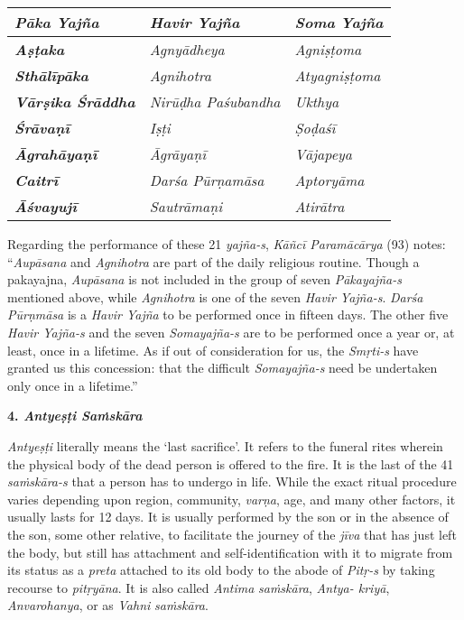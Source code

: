 \begin{longtable}{|l|l|l|}
\hline
\emph{Pāka} \emph{Yajña} & \emph{Havir} \emph{Yajña} & \emph{Soma} \emph{Yajña}\tabularnewline
\hline
\emph{\textbf{Aṣṭaka}} & \emph{Agnyādheya} & \emph{Agniṣṭoma}\tabularnewline
\hline
\emph{\textbf{Sthālīpāka}} & \emph{Agnihotra} & \emph{Atyagniṣṭoma}\tabularnewline
\hline
\emph{\textbf{Vārṣika Śrāddha}} & \emph{Nirūḍha Paśubandha} & \emph{Ukthya}\tabularnewline
\hline
\emph{\textbf{Śrāvaṇī}} & \emph{Iṣṭi} & \emph{Ṣoḍaśī}\tabularnewline
\hline
\emph{\textbf{Āgrahāyaṇī}} & \emph{Āgrāyaṇī} & \emph{Vājapeya}\tabularnewline
\hline
\emph{\textbf{Caitrī}} & \emph{Darśa Pūrṇamāsa} & \emph{Aptoryāma}\tabularnewline
\hline
\emph{\textbf{Āśvayujī}} & \emph{Sautrāmaṇi} & \emph{Atirātra}\tabularnewline
\hline
\end{longtable}

Regarding the performance of these 21 \emph{yajña-s}, \emph{Kāñcī Paramācārya} (93) notes: ``\emph{Aupāsana} and \emph{Agnihotra} are part of the daily religious routine. Though a pakayajna, \emph{Aupāsana} is not included in the group of seven \emph{Pākayajña-s} mentioned above, while \emph{Agnihotra} is one of the seven \emph{Havir Yajña-s}. \emph{Darśa Pūrṇmāsa} is a \emph{Havir Yajña} to be performed once in fifteen days. The other five \emph{Havir Yajña-s} and the seven \emph{Somayajña-s} are to be performed once a year or, at least, once in a lifetime. As if out of consideration for us, the \emph{Smṛti-s} have granted us this concession: that the difficult \emph{Somayajña-s} need be undertaken only once in a lifetime.''

\textbf{4. \emph{Antyeṣṭi Saṁskāra}}

\emph{Antyeṣṭi} literally means the `last sacrifice'. It refers to the funeral rites wherein the physical body of the dead person is offered to the fire. It is the last of the 41 \emph{saṁskāra-s} that a person has to undergo in life. While the exact ritual procedure varies depending upon region, community, \emph{varṇa}, age, and many other factors, it usually lasts for 12 days. It is usually performed by the son or in the absence of the son, some other relative, to facilitate the journey of the \emph{jīva} that has just left the body, but still has attachment and self-identification with it to migrate from its status as a \emph{preta} attached to its old body to the abode of \emph{Pitṛ-s} by taking recourse to \emph{pitṛyāna}. It is also called \emph{Antima} \emph{saṁskāra}, \emph{Antya- kriyā}, \emph{Anvarohanya}, or as \emph{Vahni} \emph{saṁskāra}.

